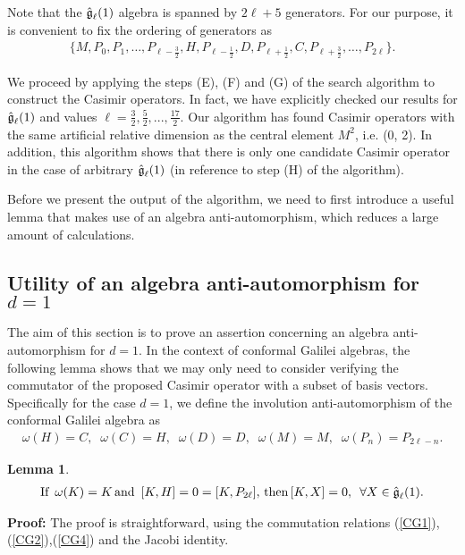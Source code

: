 \documentclass[12pt]{article}
\newtheorem{lemma}{Lemma}%
\begin{document}
Note that the $\mathfrak{\Hat{g}}_\ell(1)$ algebra is  spanned by  $2 \ell +5$
generators. For our purpose, it is convenient to fix the ordering of generators
as
\begin{eqnarray}
\{ M, P_{0},P_{1}, \ldots, P_{\ell- \frac{3}{2}}, H, P_{\ell- \frac{1}{2}}, D,
	P_{\ell+ \frac{1}{2}}, C, P_{\ell+\frac{3}{2}}, \ldots, P_{2\ell} \}. \label{ord=1}
\end{eqnarray}

We  proceed by applying the steps (E), (F) and (G) of the  search algorithm  to
construct the  Casimir operators. In fact, we have explicitly checked our
results for  $\mathfrak{\Hat{g}}_\ell(1)$ and  values
$\ell=\frac{3}{2},\frac{5}{2},. . . ,\frac{17}{2}$. Our algorithm has found
Casimir operators with the same artificial relative dimension as the central
element $M^2$, i.e. (0, 2).  In addition, this algorithm shows that there is
only one candidate
Casimir operator in the case of arbitrary $\mathfrak{\Hat{g}}_\ell(1)$ (in
reference to step (H) of the algorithm). 

Before we present the output of the algorithm, we need to first introduce a
useful lemma that makes use of an algebra anti-automorphism, which reduces a large amount of
calculations.

\subsection{Utility of an algebra anti-automorphism for  $d=1$} 
The aim of this section is to prove an assertion concerning an algebra anti-automorphism for  $d=1$. 
In the context of conformal Galilei algebras, the  following lemma shows that we may only need to consider verifying the commutator of the proposed Casimir operator with a subset of  basis vectors. Specifically for the case $d=1$, we define the involution anti-automorphism of the conformal Galilei algebra as\cite{Ai12}
\begin{eqnarray}
\omega(H)=C, \,\,\ \omega(C)=H, \,\,\ \omega(D)=D, \,\,\ \omega(M)=M, \,\,\ \omega(P_{n})=P_ {2\ell-n}.\label{omg1} 
\end{eqnarray}
\begin{lemma} \label{lem111}
\begin{eqnarray}
\text{If}  \,\ \omega(K)=K \, \text{and}\,\ [K, H]=0=[K,P_ {2\ell}], \,
	\text{then}\, [K, X]=0, \,\,\, \forall X \in \mathfrak{\Hat{g}}_{\ell}(1). \label{lem1}
\end{eqnarray}
\end{lemma}
 {\large \bf Proof:}
The proof is straightforward, using the commutation relations (\ref{CG1}),(\ref{CG2}),(\ref{CG4}) and the Jacobi identity.\\
\end{document}
